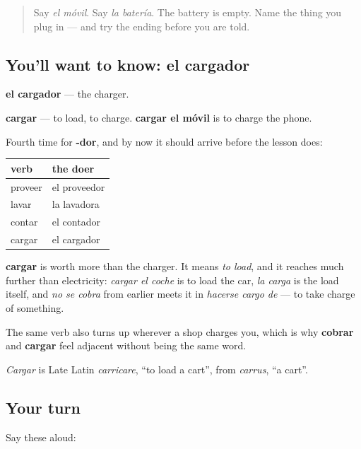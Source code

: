 \label{lesson:ES-C434-cargador}



\begin{quote}
Say \emph{el móvil}. Say \emph{la batería}. The battery is empty. Name the thing you plug in — and try the ending before you are told.
\end{quote}

\subsection*{You'll want to know: el cargador}
\textbf{el cargador} — the charger.

\textbf{cargar} — to load, to charge. \textbf{cargar el móvil} is to charge the phone.

\begin{cousinweb}
Fourth time for \textbf{-dor}, and by now it should arrive before the lesson does:

\noindent
\begin{tabularx}{\linewidth}{@{}>{\raggedright\arraybackslash}X>{\raggedright\arraybackslash}X@{}}
\toprule
\textbf{verb} & \textbf{the doer} \\
\midrule
proveer & el proveedor \\
lavar & la lavadora \\
contar & el contador \\
cargar & el cargador \\
\bottomrule
\end{tabularx}

\textbf{cargar} is worth more than the charger. It means \emph{to load}, and it reaches much further than electricity: \emph{cargar el coche} is to load the car, \emph{la carga} is the load itself, and \emph{no se cobra} from earlier meets it in \emph{hacerse cargo de} — to take charge of something.

The same verb also turns up wherever a shop charges you, which is why \textbf{cobrar} and \textbf{cargar} feel adjacent without being the same word.

\emph{Cargar} is Late Latin \emph{carricare}, \textquotedblleft{}to load a cart\textquotedblright{}, from \emph{carrus}, \textquotedblleft{}a cart\textquotedblright{}.
\end{cousinweb}

\subsection*{Your turn}
Say these aloud:

